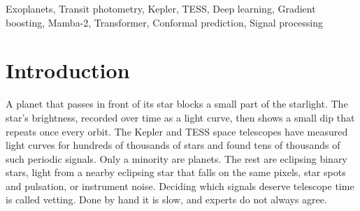 \documentclass[conference,a4paper]{IEEEtran}
\begin{document}
\maketitle

\begin{abstract}
Space telescopes such as Kepler and TESS find far more periodic dips in star brightness than people can check by hand, and most of these dips are not planets. In this project we built TransitVet, an open pipeline that takes the light curve of a star, searches it for repeating dips, and gives each signal a calibrated score and a three-way call: keep, drop, or needs a person. We first reproduced the AstroNet convolutional network on Kepler DR24 (accuracy 0.955, ROC-AUC 0.989) and showed that splitting the data by star gives lower, more realistic numbers. Under one strict protocol (split by star, every choice made on validation stars, test stars used once) we compared a threshold rule, gradient boosting, AstroNet, a pretrained Transformer and a Mamba-2 state-space model. The released tool combines gradient boosting, Mamba-2 and the Transformer. On held-out stars it reaches a precision-recall AUC of 0.963 on Kepler (2,373 signals) and 0.950 on TESS (1,000 signals), within the uncertainty of the published ExoMiner++ scores on shared signals. A class-conditional conformal check keeps at least 95\% coverage for both classes. An injection-recovery test with 90 synthetic planets shows that the search finds half of them at a signal-to-noise ratio of about 10. We release the code, a web dashboard and scores for 4,408 open TESS signals.
\end{abstract}

\begin{IEEEkeywords}
Exoplanets, Transit photometry, Kepler, TESS, Deep learning, Gradient boosting, Mamba-2, Transformer, Conformal prediction, Signal processing
\end{IEEEkeywords}

\section{Introduction}
A planet that passes in front of its star blocks a small part of the starlight. The star's brightness, recorded over time as a light curve, then shows a small dip that repeats once every orbit. The Kepler \cite{r1} and TESS \cite{r2} space telescopes have measured light curves for hundreds of thousands of stars and found tens of thousands of such periodic signals. Only a minority are planets. The rest are eclipsing binary stars, light from a nearby eclipsing star that falls on the same pixels, star spots and pulsation, or instrument noise. Deciding which signals deserve telescope time is called vetting. Done by hand it is slow, and experts do not always agree.
\end{document}
